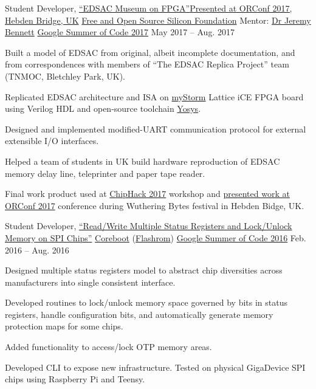 \begin{cvexperience}
\cvposition
	{Student Developer, \href{https://github.com/librecores/gsoc-museum-edsac}{``EDSAC Museum on FPGA''}\quad\textbar\quad \href{https://orconf.org/2017/\#edsac}{Presented at ORConf 2017, Hebden Bridge, UK}} %
	{\href{https://fossi-foundation.org}{Free and Open Source Silicon Foundation}} %
	{Mentor: \href{http://www.jeremybennett.com}{Dr Jeremy Bennett}} %
	{\href{https://summerofcode.withgoogle.com/archive/2017/projects/6470218444439552/}{Google Summer of Code 2017}} %
	{May 2017 -- Aug. 2017} %
	{\begin{cvitems} %
		\item {Built a model of EDSAC from original, albeit incomplete documentation, and from correspondences with members of ``The EDSAC Replica Project'' team (TNMOC, Bletchley Park, UK).}
		\item {Replicated EDSAC architecture and ISA on \href{https://mystorm.uk/}{myStorm} Lattice iCE FPGA board using Verilog HDL and open-source toolchain \href{http://www.clifford.at/yosys/}{Yosys}.}
		\item {Designed and implemented modified-UART communication protocol for external extensible I/O interfaces.}
		\item {Helped a team of students in UK build hardware reproduction of EDSAC memory delay line, teleprinter and paper tape reader.}
		\item {Final work product used at \href{http://chiphack.org/chiphack-2017.html}{ChipHack 2017} workshop and \href{https://youtu.be/EZkJOyOcYiY}{presented work at ORConf 2017} conference during Wuthering Bytes festival in Hebden Bidge, UK.}
	\end{cvitems}}

\cvposition
	{Student Developer, \href{https://drive.google.com/drive/u/1/folders/0B-Cccp-WWmeuUlh5M3pxT0cyQm8}{``Read/Write Multiple Status Registers and Lock/Unlock Memory on SPI Chips''}} %
	{\href{https://www.coreboot.org}{Coreboot} (\href{https://www.flashrom.org/Flashrom}{Flashrom})} %
	{} %
	{\href{https://summerofcode.withgoogle.com/archive/2016/projects/5439533130711040/}{Google Summer of Code 2016}} %
	{Feb. 2016 -- Aug. 2016} %
	{\begin{cvitems} %
		\item {Designed multiple status registers model to abstract chip diversities across manufacturers into single consistent interface.}
		\item {Developed routines to lock/unlock memory space governed by bits in status registers, handle configuration bits, and automatically generate memory protection maps for some chips.}
		\item {Added functionality to access/lock OTP memory areas.}
		\item {Developed CLI to expose new infrastructure. Tested on physical GigaDevice SPI chips using Raspberry Pi and Teensy.}
	\end{cvitems}}


\end{cvexperience}
